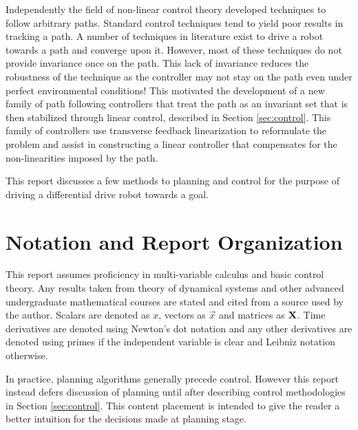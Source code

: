 \documentclass[oneside, 11pt]{book}
\begin{document}
Independently the field of non-linear control theory developed techniques to follow arbitrary paths. Standard control techniques tend to yield poor results in tracking a path. A number of techniques in literature exist to drive a robot towards a path and converge upon it. However, most of these techniques do not provide invariance once on the path\cite{Gill15}. This lack of invariance reduces the robustness of the technique as the controller may not stay on the path even under perfect environmental conditions! This motivated the development of a new family of path following controllers that treat the path as an invariant set that is then stabilized through linear control, described in Section \ref{sec:control}. This family of controllers use transverse feedback linearization to reformulate the problem and assist in constructing a linear controller that compensates for the non-linearities imposed by the path.

This report discusses a few methods to planning and control for the purpose of driving a differential drive robot towards a goal.

\section{Notation and Report Organization}
This report assumes proficiency in multi-variable calculus and basic control theory. Any results taken from theory of dynamical systems and other advanced undergraduate mathematical courses are stated and cited from a source used by the author. Scalars are denoted as $x$, vectors as $\vec{x}$ and matrices as $\mathbf{X}$. Time derivatives are denoted using Newton's dot notation and any other derivatives are denoted using primes if the independent variable is clear and Leibniz notation otherwise.

In practice, planning algorithms generally precede control. However this report instead defers discussion of planning until after describing control methodologies in Section \ref{sec:control}. This content placement is intended to give the reader a better intuition for the decisions made at planning stage.
\end{document}

